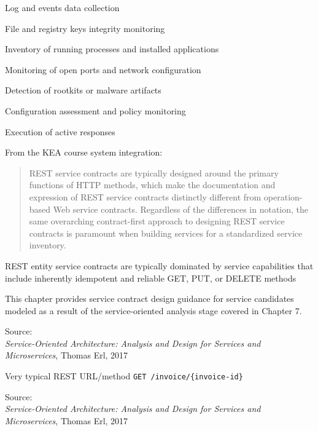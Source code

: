\documentclass[Screen16to9,17pt]{foils}
\begin{document}
\begin{list2}
\item Log and events data collection
\item File and registry keys integrity monitoring
\item Inventory of running processes and installed applications
\item Monitoring of open ports and network configuration
\item Detection of rootkits or malware artifacts
\item Configuration assessment and policy monitoring
\item Execution of active responses
\end{list2}






From the KEA course system integration:
\begin{quote}
REST service contracts are typically designed around the primary functions of HTTP methods, which make the documentation and expression of REST service contracts distinctly different from operation-based Web service contracts. Regardless of the differences in notation, the same overarching contract-first approach to designing REST service contracts is paramount when building services for a standardized service inventory.
\end{quote}

\begin{list2}
\item REST entity service contracts are typically dominated by service capabilities that include inherently idempotent and reliable GET, PUT, or DELETE methods
\item This chapter provides service contract design guidance for service candidates modeled as a result of the service-oriented analysis stage covered in Chapter 7.
\end{list2}
Source: {\footnotesize\\
\emph{Service‑Oriented Architecture: Analysis and Design for Services and Microservices}, Thomas Erl, 2017}







\begin{list2}
\item Very typical REST URL/method \verb+GET /invoice/{invoice-id}+
\end{list2}
Source: {\footnotesize\\
\emph{Service‑Oriented Architecture: Analysis and Design for Services and Microservices}, Thomas Erl, 2017}
\end{document}
